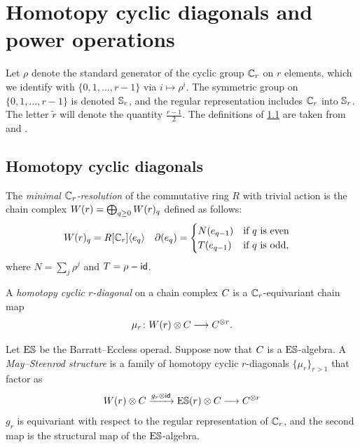 
\section{Homotopy cyclic diagonals and power operations}\label{s:2bdiagonals}

Let $\rho$ denote the standard generator of the cyclic group $\mathbb{C}_r$ on $r$ elements, which we identify with $\{0,1,\dots,r-1\}$ via $i\mapsto \rho^i$.
The symmetric group on $\{0,1,\dots,r-1\}$ is denoted $\mathbb{S}_r$, and the regular representation includes $\mathbb{C}_r$ into $\mathbb{S}_r$.
The letter $\tilde{r}$ will denote the quantity $\frac{r-1}{2}$.
The definitions of \cref{s:unstable} are taken from \cite{may1970general} and \cite{medina2021may_st}.

\subsection{Homotopy cyclic diagonals}\label{s:unstable}

The \emph{minimal $\mathbb{C}_r$-resolution} of the commutative ring $R$ with trivial action is the chain complex $W(r) = \bigoplus_{q \geq 0} W(r)_q$ defined as follows:
\begin{align*}
	W(r)_q &= R[\mathbb{C}_r]\langle e_q\rangle &
	\partial(e_q) &= \begin{cases}
		N(e_{q-1}) & \text{if $q$ is even} \\
		T(e_{q-1}) & \text{if $q$ is odd,}
	\end{cases}
\end{align*}
where $N = \sum_j \rho^j$ and $T = \rho - \mathsf{id}$.

\begin{definition}
	A \emph{homotopy cyclic $r$-diagonal} on a chain complex $C_{}$ is a $\mathbb{C}_r$-equivariant chain map
	\[
	\mu_r \colon W(r) \otimes C_{} \longrightarrow C_{}^{\otimes r}.
	\]
\end{definition}

Let $\mathrm{E}\mathbb{S}$ be the Barratt--Eccless operad. Suppose now that $C_{}$ is a $\mathrm{E}\mathbb{S}$-algebra. A \emph{May--Steenrod structure} is a family of homotopy cyclic $r$-diagonals $\{\mu_r\}_{r>1}$ that factor as
\[
W(r) \otimes C_{} \xrightarrow{g_r \otimes \mathsf{id}} \mathrm{E}\mathbb{S}(r) \otimes C_{} \longrightarrow C_{}^{\otimes r}
\]
$g_r$ is equivariant with respect to the regular representation of $\mathbb{C}_r$, and the second map is the structural map of the $\mathrm{E}\mathbb{S}$-algebra.	

